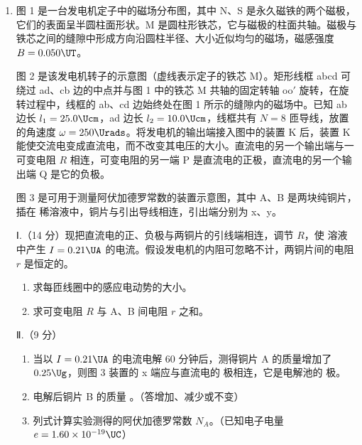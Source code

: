 \documentclass[\gkver]{gaokaozhenti}
\begin{document}
\begin{enumerate}
{（1）$E=0$，$B=0$；

（2）$E=0$，$B\neq0$。$B$ 的方向与 $z$ 轴的正方向平行或反平行。$B$ 的大小可任意；

（3）$E\neq0$，$B\neq0$。磁场方向可在平行于 $xy$ 平面的任何方向；电场 $E$ 方向平行于 $xy$ 平面，并与 $B$ 的方向垂直；当迎着 $z$ 轴正方向看时，由 $B$ 的方向沿顺时针转 $90^{\circ}$ 后就是 $E$ 的方向；$E$ 和 $B$ 的大小可取满足关系式 $\frac{E}{B}=v_{0}$ 的任何值。
}

\item
图 1 是一台发电机定子中的磁场分布图，其中 N、S 是永久磁铁的两个磁极，它们的表面呈半圆柱面形状。M 是圆柱形铁芯，它与磁极的柱面共轴。磁极与铁芯之间的缝隙中形成方向沿圆柱半径、大小近似均匀的磁场，磁感强度 $B=0.050\UT$。

图 2 是该发电机转子的示意图（虚线表示定子的铁芯 M）。矩形线框 abcd 可绕过 ad、cb 边的中点并与图 1 中的铁芯 M 共轴的固定转轴 oo$'$ 旋转，在旋转过程中，线框的 ab、cd 边始终处在图 1 所示的缝隙内的磁场中。已知 ab 边长 $l_{1}=25.0\Ucm$，ad 边长 $l_{2}=10.0\Ucm$，线框共有 $N=8$ 匝导线，放置的角速度 $\omega=250\Urads$。将发电机的输出端接入图中的装置 K 后，装置 K 能使交流电变成直流电，而不改变其电压的大小。直流电的另一个输出端与一可变电阻 $R$ 相连，可变电阻的另一端 P 是直流电的正极，直流电的另一个输出端 Q 是它的负极。

图 3 是可用于测量阿伏加德罗常数的装置示意图，其中 A、B 是两块纯铜片，插在  稀溶液中，铜片与引出导线相连，引出端分别为 x、y。

Ⅰ.（14 分）现把直流电的正、负极与两铜片的引线端相连，调节 $R$，使  溶液中产生 $I=0.21\UA$ 的电流。假设发电机的内阻可忽略不计，两铜片间的电阻 $r$ 是恒定的。
\begin{enumerate}
	\item
	求每匝线圈中的感应电动势的大小。
	\item
	求可变电阻 $R$ 与 A、B 间电阻 $r$ 之和。
\end{enumerate}

Ⅱ.（9 分）
\begin{enumerate}
	\item
	当以 $I=0.21\UA$ 的电流电解 60 分钟后，测得铜片 A 的质量增加了 $0.25\Ug$，则图 3 装置的 x 端应与直流电的  极相连，它是电解池的  极。
	\item
	电解后铜片 B 的质量 。（答增加、减少或不变）
	\item
	列式计算实验测得的阿伏加德罗常数 $N_{A}$。（已知电子电量 $e=1.60\times10^{-19}\UC$）
\end{enumerate}


\end{enumerate}
\end{document}
